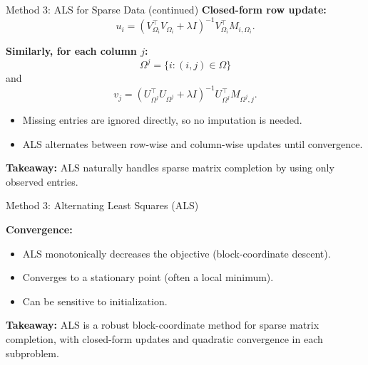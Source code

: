 \documentclass[aspectratio=169,usenames,dvipsnames]{beamer}
\begin{document}
\begin{frame}{Method 3: ALS for Sparse Data (continued)}
\textbf{Closed-form row update:}
\[
u_i=
\left(V_{\Omega_i}^\top V_{\Omega_i}+\lambda I\right)^{-1}
V_{\Omega_i}^\top M_{i,\Omega_i}.
\]

\vspace{0.2cm}
\textbf{Similarly, for each column \(j\):}
\[
\Omega^j=\{i:(i,j)\in\Omega\}
\]
and
\[
v_j=
\left(U_{\Omega^j}^\top U_{\Omega^j}+\lambda I\right)^{-1}
U_{\Omega^j}^\top M_{\Omega^j,j}.
\]

\begin{itemize}
    \item Missing entries are ignored directly, so no imputation is needed.
    \item ALS alternates between row-wise and column-wise updates until convergence.
\end{itemize}

\textbf{Takeaway:}
ALS naturally handles sparse matrix completion by using only observed entries.
\end{frame}


\begin{frame}{Method 3: Alternating Least Squares (ALS)}


\vspace{0.2cm}
\textbf{Convergence:}
\begin{itemize}
    \item ALS monotonically decreases the objective (block-coordinate descent).
    \item Converges to a stationary point (often a local minimum).
    \item Can be sensitive to initialization.
\end{itemize}

\vspace{0.2cm}
\textbf{Takeaway:} ALS is a robust block-coordinate method for sparse matrix completion, with closed-form updates and quadratic convergence in each subproblem.
\end{frame}
\end{document}
